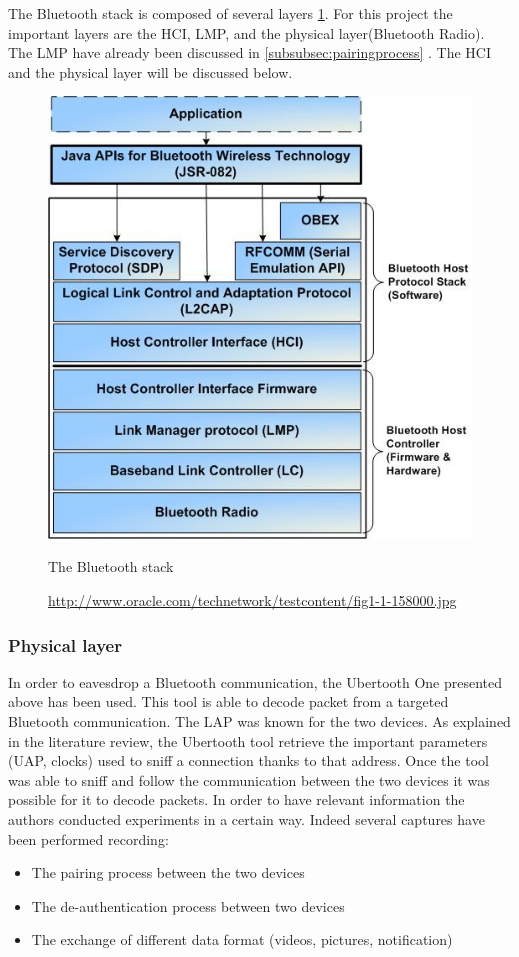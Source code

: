 
The Bluetooth stack is composed of several layers \ref{fig:bt_stack}. For this project the important layers are the HCI, LMP, and the physical layer(Bluetooth Radio). The LMP have already been discussed in \ref{subsubsec:pairingprocess} . The HCI and the physical layer will be discussed below.

\begin{figure}[h]
  \includegraphics[scale=0.8]{images/bluetoothstack.jpg}
  \caption{The Bluetooth stack}
  \label{fig:bt_stack}
  \caption*{\url{http://www.oracle.com/technetwork/testcontent/fig1-1-158000.jpg}}
\end{figure}
\newpage
\subsubsection{Physical layer}
	In order to eavesdrop a Bluetooth communication, the Ubertooth One presented above has been used. This tool is able to decode packet from a targeted Bluetooth communication. \pend
	The LAP was known for the two devices. As explained in the literature review, the Ubertooth tool retrieve the important parameters (UAP, clocks) used to sniff a connection thanks to that address. Once the tool was able to sniff and follow the
	 communication between the two devices it was possible for it to decode packets.
	In order to have relevant information the authors conducted experiments in a certain way. Indeed several captures have been performed recording:
\begin{itemize}
	\item The pairing process between the two devices
	\item The de-authentication process between two devices
	\item The exchange of different data format (videos, pictures, notification) 
\end{itemize}
		 

